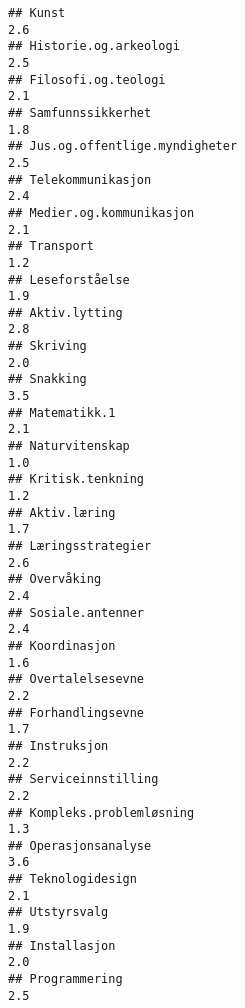 \documentclass[
]{article}
\begin{document}
\begin{verbatim}
## Kunst                                                                            2.6
## Historie.og.arkeologi                                                            2.5
## Filosofi.og.teologi                                                              2.1
## Samfunnssikkerhet                                                                1.8
## Jus.og.offentlige.myndigheter                                                    2.5
## Telekommunikasjon                                                                2.4
## Medier.og.kommunikasjon                                                          2.1
## Transport                                                                        1.2
## Leseforståelse                                                                   1.9
## Aktiv.lytting                                                                    2.8
## Skriving                                                                         2.0
## Snakking                                                                         3.5
## Matematikk.1                                                                     2.1
## Naturvitenskap                                                                   1.0
## Kritisk.tenkning                                                                 1.2
## Aktiv.læring                                                                     1.7
## Læringsstrategier                                                                2.6
## Overvåking                                                                       2.4
## Sosiale.antenner                                                                 2.4
## Koordinasjon                                                                     1.6
## Overtalelsesevne                                                                 2.2
## Forhandlingsevne                                                                 1.7
## Instruksjon                                                                      2.2
## Serviceinnstilling                                                               2.2
## Kompleks.problemløsning                                                          1.3
## Operasjonsanalyse                                                                3.6
## Teknologidesign                                                                  2.1
## Utstyrsvalg                                                                      1.9
## Installasjon                                                                     2.0
## Programmering                                                                    2.5

\end{verbatim}
\end{document}
